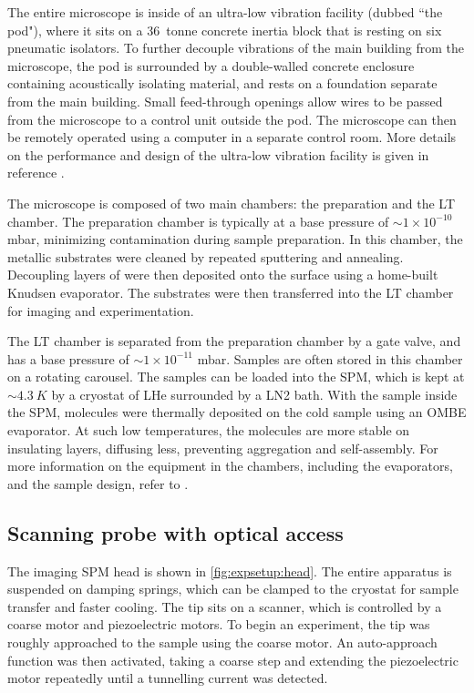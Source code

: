 The entire microscope is inside of an ultra-low vibration facility (dubbed ``the pod"), where it sits on a \SI{36}{tonne} concrete inertia block that is resting on six pneumatic isolators. To further decouple vibrations of the main building from the microscope, the pod is surrounded by a double-walled concrete enclosure containing acoustically isolating material, and rests on a foundation separate from the main building. Small feed-through openings allow wires to be passed from the microscope to a control unit outside the pod. The microscope can then be remotely operated using a computer in a separate control room. More details on the performance and design of the ultra-low vibration facility is given in reference \citep{macleod2015ultra}.

The microscope is composed of two main chambers: the preparation and the \acf{LT} chamber. The preparation chamber is typically at a base pressure of $\sim 1\times 10^{-10}$ mbar, minimizing contamination during sample preparation. In this chamber, the metallic substrates were cleaned by repeated sputtering and annealing. Decoupling layers of  were then deposited onto the surface using a home-built Knudsen evaporator. The substrates were then transferred into the \ac{LT} chamber for imaging and experimentation.

The \ac{LT} chamber is separated from the preparation chamber by a gate valve, and has a base pressure of $\sim 1\times 10^{-11}$ mbar. Samples are often stored in this chamber on a rotating carousel. The samples can be loaded into the \ac{SPM}, which is kept at $\sim \SI{4.3}{K}$ by a cryostat of \acf{LHe} surrounded by a \acf{LN2} bath. With the sample inside the \ac{SPM}, molecules were thermally deposited on the cold sample using an \ac{OMBE} evaporator. At such low temperatures, the molecules are more stable on insulating  layers, diffusing less, preventing aggregation and self-assembly. For more information on the equipment in the chambers, including the evaporators, and the sample design, refer to \citep{cochrane2017single, roussy2016coupling}. 




\subsection{Scanning probe with optical access}

The imaging \ac{SPM} head is shown in \autoref{fig:expsetup:head}. The entire apparatus is suspended on damping springs, which can be clamped to the cryostat for sample transfer and faster cooling. The tip sits on a scanner, which is controlled by a coarse motor and piezoelectric motors. To begin an experiment, the tip was roughly approached to the sample using the coarse motor. An auto-approach function was then activated, taking a coarse step and extending the piezoelectric motor repeatedly until a tunnelling current was detected.

